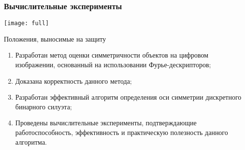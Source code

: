 \documentclass[11pt]{beamer}
\begin{document}
\begin{frame}
\frametitle{Вычислительные эксперименты}
\texttt{[image: full]}
\end{frame}


\begin{frame}{Положения, выносимые на защиту}
\begin{enumerate}
\item Разработан метод оценки симметричности объектов на цифровом изображении, основанный на использовании Фурье-дескрипторов;
\item Доказана корректность данного метода;
\item Разработан эффективный алгоритм определения оси симметрии дискретного бинарного силуэта; 
\item Проведены вычислительные эксперименты, подтверждающие работоспособность, эффективность и практическую полезность данного алгоритма.
\end{enumerate}
\end{frame}
\end{document}
